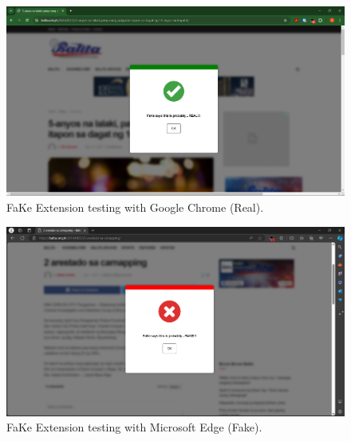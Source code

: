         \begin{figure}[h!]
            \centering
            \includegraphics[width=1\textwidth,height=1\textheight, keepaspectratio]{figures/Screenshots/chrome-true-negative.png}
            \caption{FaKe Extension testing with Google Chrome (Real).}
            \label{fig:real-chrome-test}
            \end{figure}

        \begin{figure}[h!]
            \centering
            \includegraphics[width=1\textwidth,height=1\textheight, keepaspectratio]{figures/Screenshots/edge-true-positive.png}
            \caption{FaKe Extension testing with Microsoft Edge (Fake).}
            \label{fig:fake-edge-test}
        \end{figure}

